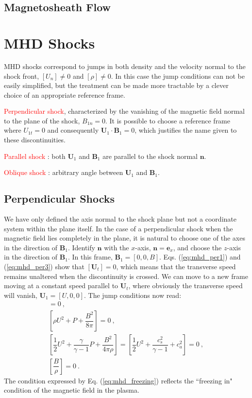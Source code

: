 \documentclass[12pt,a4paper]{article}
\renewcommand{\vec}[1]{\boldsymbol{#1}}
\begin{document}
\subsection{Magnetosheath Flow}
\cite{1996bspp.book.....B}






\section{MHD Shocks}


\cite{2015bps..book.....C} MHD shocks correspond to jumps in both density and the velocity normal to the shock front, $[U_n] \neq 0$ and $[\rho] \neq 0$. In this case the jump conditions can not be easily simplified, but the treatment can be made more tractable by a clever choice of an appropriate reference frame. 

\textcolor{red}{Perpendicular shock}, characterized by the vanishing of the magnetic field normal to the plane of the shock, $B_{1n} = 0$. It is possible to choose a reference frame where $U_{1t} = 0$ and consequently $\vec{U}_1 \cdot \vec{B}_1 = 0$, which justifies the name given to these discontinuities.

\textcolor{red}{Parallel shock} : both $\vec{U}_1$ and $\vec{B}_1$ are parallel to the shock normal $\vec{n}$.

\textcolor{red}{Oblique shock} : arbitrary angle between $\vec{U}_1$ and $\vec{B}_1$.

\subsection{Perpendicular Shocks}
\cite{2015bps..book.....C} We have only defined the axis normal to the shock plane but not a coordinate system within the plane itself. In the case of a perpendicular shock when the magnetic field lies completely in the plane, it is natural to choose one of the axes in the direction of $\vec{B}_1$. Identify $\vec{n}$ with the $x$-axis, $\vec{n} = \vec{e}_x$, and choose the $z$-axis in the direction of $\vec{B}_1$. In this frame, $\vec{B}_1 = [0, 0, B]$. Eqs. (\ref{eq:mhd_per1}) and (\ref{eq:mhd_per3}) show that $[\vec{U}_t] = 0$, which means that the transverse speed remains unaltered when the discontinuity is crossed. We can move to a new frame moving at a constant speed parallel to $\vec{U}_t$, where obviously the transverse speed will vanish, $\vec{U}_1 = [U, 0, 0]$. The jump conditions now read:
\begin{align}
[\rho U] = 0 ~, \label{eq:mhd_p1} \\
\left[\rho U^2 +P +\dfrac{B^2}{8\pi} \right] = 0 ~, \label{eq:mhd_p2} \\
\left[\dfrac{1}{2} U^2 +\dfrac{\gamma}{\gamma -1} P +\dfrac{B^2}{4\pi \rho} \right] = \left[\dfrac{1}{2} U^2 +\dfrac{c_s^2}{\gamma -1} +c_a^2 \right] = 0 ~, \label{eq:mhd_p3} \\
\left[\dfrac{B}{\rho} \right] = 0 ~. \label{eq:mhd_freezing}
\end{align}
The condition expressed by Eq. (\ref{eq:mhd_freezing}) reflects the ``freezing in" condition of the magnetic field in the plasma.
\end{document}
